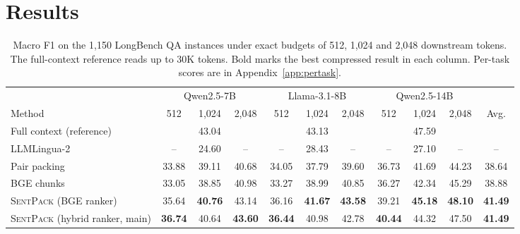 \documentclass[11pt]{article}
\newcommand{\spk}{\textsc{SentPack}}
\begin{document}
\section{Results}

\begin{table}[t]
\centering
\small
\setlength{\tabcolsep}{4.5pt}
\begin{tabular}{l ccc ccc ccc c}
\toprule
& \multicolumn{3}{c}{Qwen2.5-7B} & \multicolumn{3}{c}{Llama-3.1-8B} & \multicolumn{3}{c}{Qwen2.5-14B} & \\
\cmidrule(lr){2-4}\cmidrule(lr){5-7}\cmidrule(lr){8-10}
Method & 512 & 1,024 & 2,048 & 512 & 1,024 & 2,048 & 512 & 1,024 & 2,048 & Avg. \\
\midrule
Full context (reference) & \multicolumn{3}{c}{43.04} & \multicolumn{3}{c}{43.13} & \multicolumn{3}{c}{47.59} & \\
\midrule
LLMLingua-2 & -- & 24.60 & -- & -- & 28.43 & -- & -- & 27.10 & -- & -- \\
Pair packing & 33.88 & 39.11 & 40.68 & 34.05 & 37.79 & 39.60 & 36.73 & 41.69 & 44.23 & 38.64 \\
BGE chunks & 33.05 & 38.85 & 40.98 & 33.27 & 38.99 & 40.85 & 36.27 & 42.34 & 45.29 & 38.88 \\
\midrule
\spk{} (BGE ranker) & 35.64 & \textbf{40.76} & 43.14 & 36.16 & \textbf{41.67} & \textbf{43.58} & 39.21 & \textbf{45.18} & \textbf{48.10} & \textbf{41.49} \\
\spk{} (hybrid ranker, main) & \textbf{36.74} & 40.64 & \textbf{43.60} & \textbf{36.44} & 40.98 & 42.78 & \textbf{40.44} & 44.32 & 47.50 & \textbf{41.49} \\
\bottomrule
\end{tabular}
\caption{Macro F1 on the 1,150 LongBench QA instances under exact budgets of 512, 1,024 and 2,048 downstream tokens. The full-context reference reads up to 30K tokens. Bold marks the best compressed result in each column. Per-task scores are in Appendix~\ref{app:pertask}.}
\label{tab:main}
\end{table}
\end{document}
